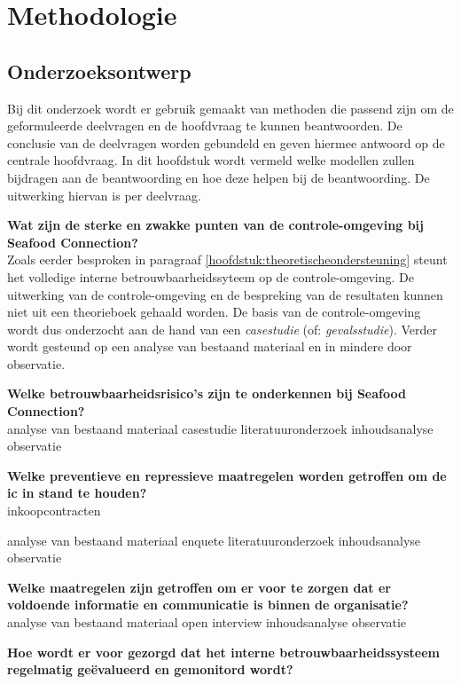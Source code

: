 \chapter{Methodologie}
\label{hoofdstuk:methodologie}
\section{Onderzoeksontwerp}
Bij dit onderzoek wordt er gebruik gemaakt van methoden die passend zijn om de geformuleerde deelvragen en de hoofdvraag te kunnen beantwoorden. De conclusie van de deelvragen worden gebundeld en geven hiermee antwoord op de centrale hoofdvraag. In dit hoofdstuk wordt vermeld welke modellen zullen bijdragen aan de beantwoording en hoe deze helpen bij de beantwoording. De uitwerking hiervan is per deelvraag. 

\bigskip \noindent
\textbf{Wat zijn de sterke en zwakke punten van de controle-omgeving bij Seafood Connection?} \\
Zoals eerder besproken in paragraaf \ref{hoofdstuk:theoretischeondersteuning} steunt het volledige interne betrouwbaarheidssyteem op de controle-omgeving. De uitwerking van de controle-omgeving en de bespreking van de resultaten kunnen niet uit een theorieboek gehaald worden. De basis van de controle-omgeving wordt dus onderzocht aan de hand van een \emph{casestudie} (of: \emph{gevalsstudie}). Verder wordt gesteund op een analyse van bestaand materiaal en in mindere door observatie.

\bigskip \noindent 
\textbf{Welke betrouwbaarheidsrisico's zijn te onderkennen bij Seafood Connection?} \\


analyse van bestaand materiaal
casestudie
literatuuronderzoek
inhoudsanalyse
observatie

\bigskip \noindent
\textbf{Welke preventieve en repressieve maatregelen worden getroffen om de \gls{ic} in stand te houden?} \\
inkoopcontracten

analyse van bestaand materiaal
enquete
literatuuronderzoek
inhoudsanalyse
observatie

\bigskip \noindent
\textbf{Welke maatregelen zijn getroffen om er voor te zorgen dat er voldoende informatie en communicatie is binnen de organisatie?} \\

analyse van bestaand materiaal
open interview
inhoudsanalyse
observatie

\bigskip \noindent
\textbf{Hoe wordt er voor gezorgd dat het interne betrouwbaarheidssysteem regelmatig geëvalueerd en gemonitord wordt?} \\

